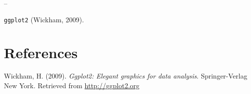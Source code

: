 \documentclass[12pt,oneside]{reedthesis}
\begin{document}
  --
  
  \texttt{ggplot2} (Wickham, 2009).
  
  \backmatter
  
  \chapter{References}\label{references}
  
  \noindent
  
  \setlength{\parindent}{-0.20in} \setlength{\leftskip}{0.20in}
  \setlength{\parskip}{8pt}
  
  \hypertarget{refs}{}
  \hypertarget{ref-wickham2009}{}
  Wickham, H. (2009). \emph{Ggplot2: Elegant graphics for data analysis}.
  Springer-Verlag New York. Retrieved from \url{http://ggplot2.org}


\end{document}
